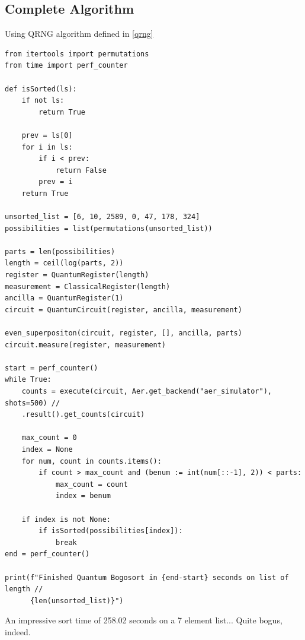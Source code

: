 \documentclass[12pt]{article}
\begin{document}
\subsection{Complete Algorithm}
Using QRNG algorithm defined in \ref{qrng}
\begin{verbatim}
from itertools import permutations
from time import perf_counter

def isSorted(ls):
    if not ls:
        return True

    prev = ls[0]
    for i in ls:
        if i < prev:
            return False
        prev = i
    return True

unsorted_list = [6, 10, 2589, 0, 47, 178, 324]
possibilities = list(permutations(unsorted_list))

parts = len(possibilities)
length = ceil(log(parts, 2))
register = QuantumRegister(length)
measurement = ClassicalRegister(length)
ancilla = QuantumRegister(1)
circuit = QuantumCircuit(register, ancilla, measurement)

even_superpositon(circuit, register, [], ancilla, parts)
circuit.measure(register, measurement)

start = perf_counter()
while True:
    counts = execute(circuit, Aer.get_backend("aer_simulator"), shots=500) //
    .result().get_counts(circuit)

    max_count = 0
    index = None
    for num, count in counts.items():
        if count > max_count and (benum := int(num[::-1], 2)) < parts:
            max_count = count
            index = benum

    if index is not None:
        if isSorted(possibilities[index]):
            break
end = perf_counter()

print(f"Finished Quantum Bogosort in {end-start} seconds on list of length //
      {len(unsorted_list)}")
\end{verbatim}
An impressive sort time of 258.02 seconds on a 7 element list... Quite bogus, indeed.
\end{document}
